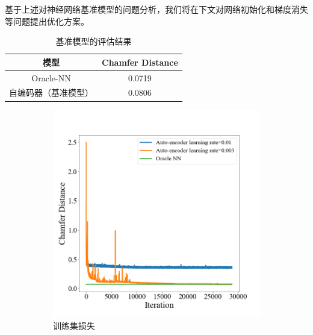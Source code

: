 \documentclass[bachelor, nocolorlinks, printoneside]{seuthesis} %
\begin{document}
\begin{Main}
基于上述对神经网络基准模型的问题分析，我们将在下文对网络初始化和梯度消失等问题提出优化方案。
\begin{table}
    \centering
    \caption{基准模型的评估结果}
    \label{table:metric_per_baseline}
    \begin{tabular}{cc} 
    \hline
    模型         & Chamfer Distance        \\ 
    \hline
    Oracle-NN  & 0.0719                  \\
    自编码器（基准模型） & 0.0806 \\
    \hline
    \end{tabular}
\end{table}

\begin{figure}[!htb]
    \centering
       \begin{subfigure}[t]{0.49\linewidth} \centering 
         \includegraphics[width=\columnwidth]{figs/model/ae_trainingloss.png}
         \caption{训练集损失}\label{fig:trainingloss}
       \end{subfigure}
      \begin{subfigure}[t]{0.49\linewidth} \centering

\end{subfigure}
\end{figure}
\end{Main}
\end{document}
